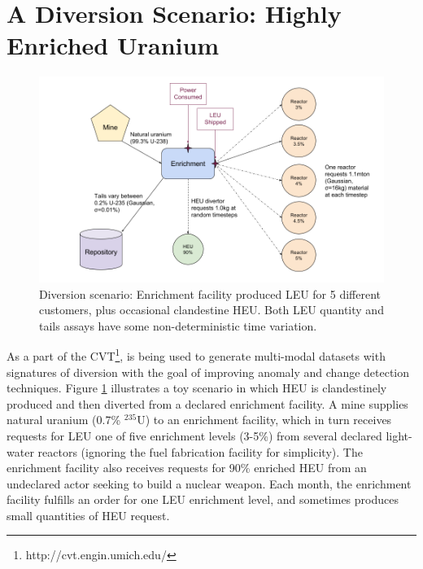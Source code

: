 \section{A Diversion Scenario: Highly Enriched Uranium}
\label{s_results}


\begin{figure}%
\begin{center}
\includegraphics[natwidth=162bp,natheight=227bp, scale=0.4]{./figs/UM_multimodal_diagram.png}
\end{center}
\caption{Diversion scenario: Enrichment facility produced LEU for 5 different customers, plus occasional clandestine HEU. Both LEU quantity and tails assays have some non-deterministic time variation.}
\label{fig:scenario_layout}
\end{figure}


As a part of the \gls{CVT}\footnote{http://cvt.engin.umich.edu/}, \Cyclus is being used to generate multi-modal datasets with signatures of diversion with the goal of improving anomaly and change detection techniques. Figure \ref{fig:scenario_layout} illustrates a toy scenario in which \gls{HEU} is clandestinely produced and then diverted from a declared enrichment facility. A mine supplies natural uranium (0.7\% $^{235}$U) to an enrichment facility, which in turn receives requests for \gls{LEU} one of five enrichment levels (3-5\%) from several declared light-water reactors (ignoring the fuel fabrication facility for simplicity).  The enrichment facility also receives requests for 90\% enriched \gls{HEU} from an undeclared actor seeking to build a nuclear weapon. Each month, the enrichment facility fulfills an order for one \gls{LEU} enrichment level, and sometimes produces small quantities of \gls{HEU} request. 


